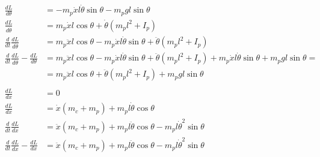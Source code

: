 \documentclass[unicode]{article}
\begin{document}
\begin{align*}
    \frac{dL}{d\theta}                                         & = - m_p \dot{x} l \dot{\theta} \sin \theta - m_p gl \sin \theta                                                                                                                    \\
    \frac{dL}{d\dot{\theta}}                                   & = m_p \dot{x} l \cos \theta + \dot{\theta} \left(m_p l^2 + I_p\right)                                                                                                              \\
    \frac{d}{dt} \frac{dL}{d\dot{\theta}}                      & = m_p \ddot{x} l \cos \theta - m_p  \dot{x}  l \dot{\theta} \sin \theta + \ddot{\theta} \left(m_p l^2 + I_p\right)                                                                 \\
    \frac{d}{dt} \frac{dL}{d\dot{\theta}} - \frac{dL}{d\theta} & = m_p \ddot{x} l \cos \theta - m_p  \dot{x}  l \dot{\theta} \sin \theta + \ddot{\theta} \left(m_p l^2 + I_p\right) + m_p \dot{x} l \dot{\theta} \sin \theta + m_p gl \sin \theta = \\
                                                               & = m_p \ddot{x} l \cos \theta + \ddot{\theta} \left(m_p l^2 + I_p\right) + m_p g l \sin \theta                                                                                      \\
                                                               &                                                                                                                                                                                    \\
    \frac{dL}{dx}                                              & = 0                                                                                                                                                                                \\
    \frac{dL}{d\dot{x}}                                        & = \dot{x}(m_c + m_p) + m_p l \dot{\theta} \cos \theta                                                                                                                              \\
    \frac{d}{dt} \frac{dL}{d\dot{x}}                           & = \ddot{x}(m_c + m_p) + m_p l \ddot{\theta} \cos \theta - m_p l \dot{\theta}^2 \sin \theta                                                                                         \\
    \frac{d}{dt} \frac{dL}{d\dot{x}} - \frac{dL}{dx}           & = \ddot{x}(m_c + m_p) + m_p l \ddot{\theta} \cos \theta - m_p l \dot{\theta}^2 \sin \theta                                                                                         \\
\end{align*}
\end{document}

